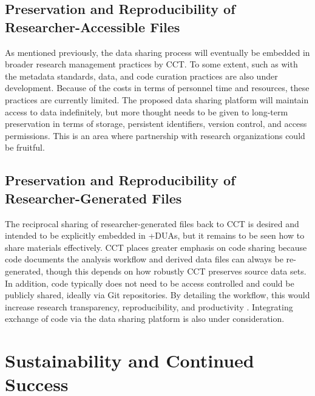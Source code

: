 \documentclass[
]{book}
\begin{document}
\hypertarget{preservation-and-reproducibility-of-researcher-accessible-files-5}{%
\subsection{Preservation and Reproducibility of Researcher-Accessible Files}\label{preservation-and-reproducibility-of-researcher-accessible-files-5}}

As mentioned previously, the data sharing process will eventually be embedded in broader research management practices by CCT. To some extent, such as with the metadata standards, data, and code curation practices are also under development. Because of the costs in terms of personnel time and resources, these practices are currently limited. The proposed data sharing platform will maintain access to data indefinitely, but more thought needs to be given to long-term preservation in terms of storage, persistent identifiers, version control, and access permissions. This is an area where partnership with research organizations could be fruitful.

\hypertarget{preservation-and-reproducibility-of-researcher-generated-files-4}{%
\subsection{Preservation and Reproducibility of Researcher-Generated Files}\label{preservation-and-reproducibility-of-researcher-generated-files-4}}

The reciprocal sharing of researcher-generated files back to CCT is desired and intended to be explicitly embedded in +DUAs\textbar, but it remains to be seen how to share materials effectively. CCT places greater emphasis on code sharing because code documents the analysis workflow and derived data files can always be re-generated, though this depends on how robustly CCT preserves source data sets. In addition, code typically does not need to be access controlled and could be publicly shared, ideally via Git repositories. By detailing the workflow, this would increase research transparency, reproducibility, and productivity \citep{playford2016}. Integrating exchange of code via the data sharing platform is also under consideration.

\hypertarget{sustainability-and-continued-success-6}{%
\section{Sustainability and Continued Success}\label{sustainability-and-continued-success-6}}
\end{document}

